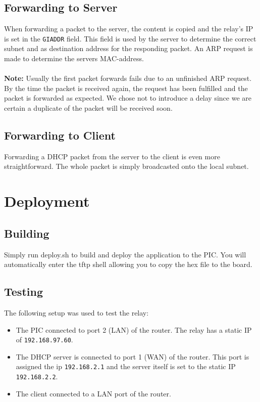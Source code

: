 \documentclass[11pt]{article}
\begin{document}
\subsection{Forwarding to Server}
When forwarding a packet to the server, the content is copied and the relay's IP
is set in the \texttt{GIADDR} field. This field is used by the server to
determine the correct subnet and as destination address for the responding
packet. An ARP request is made to determine the servers MAC-address.\\
\\
\textbf{Note:} Usually the first packet forwards fails due to an unfinished ARP
request. By the time the packet is received again, the request has been
fulfilled and the packet is forwarded as expected. We chose not to introduce a
delay since we are certain a duplicate of the packet will be received soon.

\subsection{Forwarding to Client}
Forwarding a DHCP packet from the server to the client is even more
straightforward. The whole packet is simply broadcasted onto the local subnet.

\section{Deployment}

\subsection{Building}
Simply run deploy.sh to build and deploy the application to the PIC. You will
automatically enter the tftp shell allowing you to copy the hex file to the
board.

\subsection{Testing}
The following setup was used to test the relay:

\begin{itemize}
	\item The PIC connected to port 2 (LAN) of the router. The relay has a
	static IP of \texttt{192.168.97.60}.
	\item The DHCP server is connected to port 1 (WAN) of the router. This port
	is assigned the ip \texttt{192.168.2.1} and the server itself is set to the
	static IP \texttt{192.168.2.2}.
	\item The client connected to a LAN port of the router.
\end{itemize}
\end{document}
